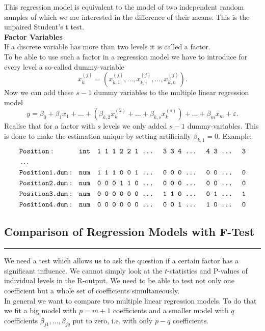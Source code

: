 This regression model is equivalent to the model of two independent random samples of which we are interested in the difference of their means. This is the unpaired Student’s t test.\\

\textbf{Factor Variables}\\
If a discrete variable has more than two levels it is called a factor.\\
To be able to use such a factor in a regression model we have to introduce for every level a so-called dummy-variable
\begin{equation}
  x_k^{(j)} = \left(x_{k,1}^{(j)}, \dots ,x_{k,i}^{(j)}, \dots, x_{k,n}^{(j)}\right).
\end{equation}
Now we can add these $s - 1$ dummy variables to the multiple linear regression model
\begin{equation}
  y = \beta_0 + \beta_1 x_1 + \dots + (\beta_{k,2}x^{(2)}_k + \dots + \beta_{k,s}x^{(s)}_k) + \dots + \beta_m x_m + \varepsilon.
\end{equation}
Realise that for a factor with $s$ levels we only added $s - 1$ dummy-variables. This is done to make the estimation unique by setting artificially $\beta_{k,1} = 0$.
Example:
\begin{align*}
  \scriptstyle
  &\texttt{Position}:      & &\texttt{int}  &\texttt{1 1 1 2 2 1 \dots\; 3 3 4 \dots\; 4 3 \dots\; 3}\\
  &\dots\\
  &\texttt{Position1.dum}: & &\texttt{num}  &\texttt{1 1 1 0 0 1 \dots\; 0 0 0 \dots\; 0 0 \dots\; 0}\\
  &\texttt{Position2.dum}: & &\texttt{num}  &\texttt{0 0 0 1 1 0 \dots\; 0 0 0 \dots\; 0 0 \dots\; 0}\\
  &\texttt{Position3.dum}: & &\texttt{num}  &\texttt{0 0 0 0 0 0 \dots\; 1 1 0 \dots\; 0 1 \dots\; 1}\\
  &\texttt{Position4.dum}: & &\texttt{num}  &\texttt{0 0 0 0 0 0 \dots\; 0 0 1 \dots\; 1 0 \dots\; 0}
\end{align*}

\subsection{Comparison of Regression Models with $\mathbf{F}$-Test}
\noindent\rule[\linienAbstand]{\linewidth}{\linienDicke}
We need a test which allows us to ask the question if a certain factor has a significant influence. We cannot simply look at the $t$-statistics and P-values of individual levels in the R-output. We need to be able to test not only one coefficient but a whole set of coefficients simultaneously.\\
In general we want to compare two multiple linear regression models. To do that we fit a big
model with $p = m + 1$ coefficients and a smaller model with $q$ coefficients $\beta_{j1} , . . . , \beta_{jq}$ put to zero, i.e. with only $p - q$ coefficients.\\

